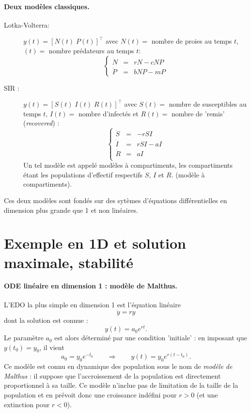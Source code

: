 \paragraph*{Deux modèles classiques.}
\begin{description}
 \item[Lotka-Volterra:] $y(t) = [N(t) \; P(t)]^\top$ avec $N(t) =$ nombre de proies au temps $t$, $(t) = $ nombre prédateurs au temps $t$:
 $$
 \left\{ \begin{array}{rcl} 
  \dot N & = & r N - c N P \\
  \dot P & = & b N P  - m P
 \end{array} \right.
 $$
 \item[SIR :] $y(t) = [S(t) \; I(t) \; R(t)]^\top$ avec $S(t) =$ nombre de susceptibles au temps $t$, $I(t) =$ nombre d'infectés et $R(t) =$ nombre de 'remis' ({\em recovered}) :
 $$
 \left\{ \begin{array}{rcl} 
  \dot S & = & - r S I \\
  \dot I & = & r S I - a I \\
  \dot R & = & a I \\
 \end{array} \right.
 $$
 Un tel modèle est appelé modèles à compartiments, les compartiments étant les populations d'effectif respectifs $S$, $I$ et $R$. 
 (modèle à compartiments).
\end{description}

Ces deux modèles sont fondés sur des sytèmes d'équations différentielles en dimension plus grande que 1 et non linéaires.

\section{Exemple en 1D et solution maximale, stabilité} \label{sec:EquaDiff-1DsolMaximale}

\paragraph*{ODE linéaire en dimension 1 : modèle de Malthus.}
L'EDO la plus simple en dimension 1 est l'équation linéaire
$$
\dot y = r y
$$
dont la solution est connue : 
$$
y(t) = a_0 e^{rt}.
$$
Le paramètre $a_0$ est alors déterminé par une condition 'initiale' : en imposant que $y(t_0) = y_0$, il vient
$$
a_0 = y_0 e^{-t_0} 
\qquad \Rightarrow \qquad
y(t) = y_0 e^{r(t-t_0)}.
$$
Ce modèle est connu en dynamique des population sous le nom de {\em modèle de Malthus} : il suppose que l'accroissement de la population est directement proportionnel à sa taille. Ce modèle n'inclue pas de limitation de la taille de la population et en prévoit donc une croissance indéfini pour $r > 0$ (et une extinction pour $r < 0$).



